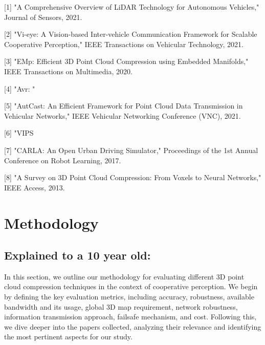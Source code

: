\documentclass[conference]{IEEEtran}
\begin{document}

    [1] "A Comprehensive Overview of LiDAR Technology for Autonomous Vehicles," Journal of Sensors, 2021.

    [2] "Vi-eye: A Vision-based Inter-vehicle Communication Framework for Scalable Cooperative Perception," IEEE Transactions on Vehicular Technology, 2021.

    [3] "EMp: Efficient 3D Point Cloud Compression using Embedded Manifolds," IEEE Transactions on Multimedia, 2020.

    [4] "Avr: "

[5] "AutCast: An Efficient Framework for Point Cloud Data Transmission in Vehicular Networks," IEEE Vehicular Networking Conference (VNC), 2021.

    [6] "VIPS

[7] "CARLA: An Open Urban Driving Simulator," Proceedings of the 1st Annual Conference on Robot Learning, 2017.

    [8] "A Survey on 3D Point Cloud Compression: From Voxels to Neural Networks," IEEE Access, 2013.

\section{Methodology}

\subsection{Explained to a 10 year old:}

In this section, we outline our methodology for evaluating different 3D point cloud compression techniques in the context of cooperative perception. We begin by defining the key evaluation metrics, including accuracy, robustness, available bandwidth and its usage, global 3D map requirement, network robustness, information transmission approach, failsafe mechanism, and cost. Following this, we dive deeper into the papers collected, analyzing their relevance and identifying the most pertinent aspects for our study.
\end{document}
